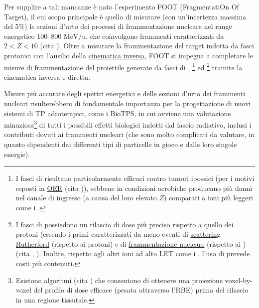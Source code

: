 \documentclass[12pt,a4paper,twoside]{report}
\begin{document}
	Per supplire a tali mancanze è nato l'esperimento FOOT (FragmentatiOn Of Target), il cui scopo principale è quello di misurare (con un'incertezza massima del $5\%$) le sezioni d'urto dei processi di frammentazione nucleare nel range energetico $100$--$800\mbox{ MeV/u}$, che coinvolgono frammenti caratterizzati da $2<Z<10$ (cita
	). Oltre a misurare la frammentazione del target indotta da fasci protonici con l'ausilio della \hyperref[sec:cinematica_inversa]{cinematica inversa}, FOOT si impegna a completare le misure di frammentazione del proiettile generate da fasci di , \footnote{I fasci di  risultano particolarmente efficaci contro tumori ipossici (per i motivi esposti in \hyperref[par:oer]{OER} (cita
		)), sebbene in condizioni aerobiche producano più danni nel canale di ingresso (a causa del loro elevato $Z$) comparati a ioni più leggeri come i .} ed \footnote{I fasci di  possiedono un rilascio di dose più preciso rispetto a quello dei protoni (essendo i primi caratterizzati da meno eventi di \hyperref[par:scattering_Rutherford]{scattering Rutherford} (rispetto ai protoni) e di \hyperref[par:interazioni_nucleari]{frammentazione nucleare} (rispetto ai ) (cita
		,
		). Inoltre, rispetto agli altri ioni ad alto LET come i , l'uso di  prevede costi più contenuti.} tramite la cinematica inversa e diretta.
		
	Misure più accurate degli spettri energetici e delle sezioni d'urto dei frammenti nucleari risulterebbero di fondamentale importanza per la progettazione di nuovi sistemi di TP adroterapici, come i BioTPS, in cui avviene una valutazione minuziosa\footnote{Esistono algoritmi (cita
		) che consentono di ottenere una proiezione voxel-by-voxel del profilo di dose efficace (pesata attraverso l'RBE) prima del rilascio in una regione tissutale.} di tutti i possibili effetti biologici indotti dal fascio radiativo, inclusi i contributi dovuti ai frammenti nucleari (che sono molto complicati da valutare, in quanto dipendenti dai differenti tipi di particelle in gioco e dalle loro singole energie).
	
\end{document}
